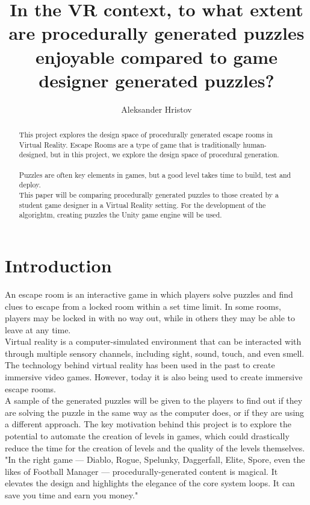 \documentclass[lettersize,journal]{IEEEtran}
\begin{document}
\title{In the VR context, to what extent are procedurally generated puzzles enjoyable compared to game designer generated puzzles?}

\author{Aleksander Hristov}

\maketitle

\begin{abstract}
    This project explores the design space of procedurally generated escape rooms in Virtual Reality. Escape Rooms are a type of game that is traditionally human-designed, but in this project, we explore the design space of procedural generation. \\
    \\
    Puzzles are often key elements in games, but a good level takes time to build, test and deploy. \\
This paper will be comparing procedurally generated puzzles to those created by a student game designer in a Virtual Reality setting. For the development of the algorightm, creating puzzles the Unity game engine will be used.

\end{abstract}

\section{Introduction}
An escape room is an interactive game in which players solve puzzles and find clues to escape from a locked room within a set time limit. In some rooms, players may be locked in with no way out, while in others they may be able to leave at any time. \\
Virtual reality is a computer-simulated environment that can be interacted with through multiple sensory channels, including sight, sound, touch, and even smell. The technology behind virtual reality has been used in the past to create immersive video games. However, today it is also being used to create immersive escape rooms.     \\
A sample of the generated puzzles will be given to the players to find out if they are solving the puzzle in the same way as the computer does, or if they are using a different approach.
The key motivation behind this project is to explore the potential to automate the creation of levels in games, which could drastically reduce the time for the creation of levels and the quality of the levels themselves.
\\"In the right game — Diablo, Rogue, Spelunky, Daggerfall, Elite, Spore, even the likes of Football Manager — procedurally-generated content is magical. It elevates the design and highlights the elegance of the core system loops. It can save you time and earn you money."\cite{gamDev}\cite{diablo}\cite{diablo2}\cite{spelunky}\cite{rogue}
\end{document}
